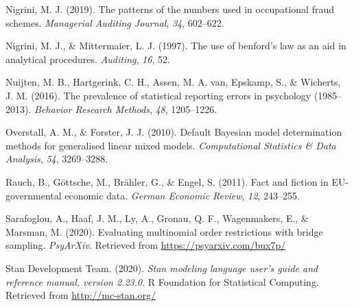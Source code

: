 \documentclass[
  english,
  man,floatsintext]{apa6}
\newlength{\cslhangindent}
\newenvironment{cslreferences}%
  {\setlength{\parindent}{0pt}%
  \everypar{\setlength{\hangindent}{\cslhangindent}}\ignorespaces}%
  {\par}
\begin{document}
\begin{cslreferences}
\leavevmode\hypertarget{ref-nigrini2019patterns}{}%
Nigrini, M. J. (2019). The patterns of the numbers used in occupational fraud schemes. \emph{Managerial Auditing Journal}, \emph{34}, 602--622.

\leavevmode\hypertarget{ref-nigrini1997use}{}%
Nigrini, M. J., \& Mittermaier, L. J. (1997). The use of benford's law as an aid in analytical procedures. \emph{Auditing}, \emph{16}, 52.

\leavevmode\hypertarget{ref-nuijten2016prevalence}{}%
Nuijten, M. B., Hartgerink, C. H., Assen, M. A. van, Epskamp, S., \& Wicherts, J. M. (2016). The prevalence of statistical reporting errors in psychology (1985--2013). \emph{Behavior Research Methods}, \emph{48}, 1205--1226.

\leavevmode\hypertarget{ref-overstall2010default}{}%
Overstall, A. M., \& Forster, J. J. (2010). Default Bayesian model determination methods for generalised linear mixed models. \emph{Computational Statistics \& Data Analysis}, \emph{54}, 3269--3288.

\leavevmode\hypertarget{ref-rauch2011fact}{}%
Rauch, B., Göttsche, M., Brähler, G., \& Engel, S. (2011). Fact and fiction in EU-governmental economic data. \emph{German Economic Review}, \emph{12}, 243--255.

\leavevmode\hypertarget{ref-sarafoglou2020evaluatingPreprint}{}%
Sarafoglou, A., Haaf, J. M., Ly, A., Gronau, Q. F., Wagenmakers, E., \& Marsman, M. (2020). Evaluating multinomial order restrictions with bridge sampling. \emph{PsyArXiv}. Retrieved from \url{https://psyarxiv.com/bux7p/}

\leavevmode\hypertarget{ref-stan2020}{}%
Stan Development Team. (2020). \emph{Stan modeling language user's guide and reference manual, version 2.23.0}. R Foundation for Statistical Computing. Retrieved from \url{http://mc-stan.org/}
\end{cslreferences}

\endgroup


\clearpage
\makeatletter
\efloat@restorefloats
\makeatother
\end{document}
